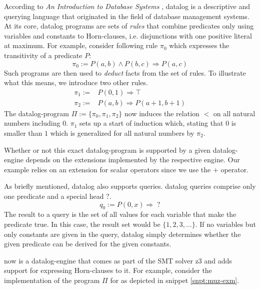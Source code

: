 According to \textit{An Introduction to Database Systems} \cite[p.790ff]{Date00}, \gls{datalog} is a descriptive and querying language that originated in the field of database management systems.
At its core, \gls{datalog} programs are sets of \textit{rules} that combine predicates only using variables and constants to Horn-clauses, i.e. disjunctions with one positive literal at maximum.
For example, consider following rule $ \pi_0 $ which expresses the transitivity of a predicate $ P $:
\begin{equation*}
    \pi_0 := P(a, b) \land P(b, c) \Rightarrow P(a, c)
\end{equation*}
Such programs are then used to \textit{deduct} facts from the set of rules.
To illustrate what this means, we introduce two other rules.
\begin{align*}
    \pi_1 := & P(0, 1) \Rightarrow \top \\
    \pi_2 := & P(a, b) \Rightarrow P(a + 1, b + 1)
\end{align*}
The \gls{datalog}-program $ \Pi := \{ \pi_0, \pi_1, \pi_2 \} $ now induces the relation $ < $ on all natural numbers including $ 0 $.
$ \pi_1 $ sets up a start of induction which, stating that $ 0 $ is smaller than $ 1 $ which is generalized for all natural numbers by $ \pi_2 $.

Whether or not this exact \gls{datalog}-program is supported by a given \gls{datalog}-engine depends on the extensions implemented by the respective engine.
Our example relies on an extension for scalar operators since we use the $ + $ operator.

As briefly mentioned, \gls{datalog} also supports queries.
\gls{datalog} queries comprise only one predicate and a special head $ ? $.
\begin{equation*}
    q_0 := P(0, x) \Rightarrow \; ?
\end{equation*}
The result to a query is the set of all values for each variable that make the predicate true.
In this case, the result set would be $ \{ 1, 2, 3, \dots \} $.
If no variables but only constants are given in the query, \gls{datalog} simply determines whether the given predicate can be derived for the given constants.

\muZ{} now is a \gls{datalog}-engine that comes as part of the SMT solver z3 \cite{Moura08} and adds support for expressing Horn-clauses to it.
For example, consider the implementation of the program $ \Pi $ for \muZ{} as depicted in snippet \ref{snpt:muz-exm}.

